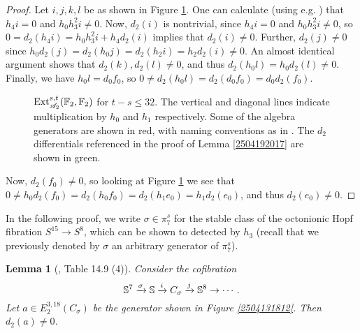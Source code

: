 \documentclass[11pt, titlepage]{article} %
\def\bb{\ensuremath\mathbb}
\def\A{\ensuremath{\mathscr{A}_2}}
\DeclareMathOperator{\Ext}{Ext}
\numberwithin{equation}{subsection}
\theoremstyle{plain}
\newtheorem{lemma}[theorem]{Lemma}
\theoremstyle{definition}
\begin{document}
\begin{proof}
Let \(i, j, k, l\) be as shown in Figure \ref{2504201924}. One can calculate (using e.g. \autocite{ext}) that \(h_4i=0\) and \(h_0h_3^2i\neq 0\). Now, \(d_2(i)\) is nontrivial, since \(h_4i=0\) and \(h_0h_3^2i\neq 0\), so \(0=d_2(h_4i)=h_0h_3^2i+h_4d_2(i)\) implies that \(d_2(i)\neq 0\). Further, \(d_2(j)\neq 0\) since \(h_0d_2(j)=d_2(h_0j)=d_2(h_2i)=h_2d_2(i)\neq 0\). An almost identical argument shows that \(d_2(k), d_2(l)\neq0\), and thus \(d_2(h_0l)=h_0d_2(l)\neq 0\). Finally, we have \(h_0l=d_0f_0\), so \(0\neq d_2(h_0l)=d_2(d_0f_0)=d_0d_2(f_0)\).
\begin{landscape}
\begin{figure}
\centering

\caption{\(\Ext^{s,t}_{\A}(\bb{F}_2, \bb{F}_2)\) for \(t-s\leq 32\). The vertical and diagonal lines indicate multiplication by \(h_0\) and \(h_1\) respectively. Some of the algebra generators are shown in red, with naming conventions as in \autocite{rognes2}. The \(d_2\) differentials referenced in the proof of Lemma \ref{2504192017} are shown in green.}
\label{2504201924}
\end{figure}
\end{landscape}
Now, \(d_2(f_0)\neq 0\), so looking at Figure \ref{2504201924} we see that \(0\neq h_0d_2(f_0)=d_2(h_0f_0)=d_2(h_1e_0)=h_1d_2(e_0)\), and thus \(d_2(e_0)\neq 0\).
\end{proof}

In the following proof, we write \(\sigma\in \pi_7^s\) for the stable class of the octonionic Hopf fibration \(S^{15}\to S^8\), which can be shown to detected by \(h_3\) (recall that we previously denoted by \(\sigma\) an arbitrary generator of \(\pi_7^s\)). 

\begin{lemma}[{\autocite{rognes2}, Table 14.9 (4)}]\label{2504131851}
Consider the cofibration
\[\bb{S}^7 \xrightarrow{\sigma} \bb{S} \xrightarrow{i} C_\sigma \xrightarrow{j} \bb{S}^8\to \cdots.\]
Let \(a\in E_2^{3,18}(C_\sigma)\) be the generator shown in Figure \ref{2504131812}. Then \(d_2(a)\neq 0\).
\end{lemma}
\end{document}

